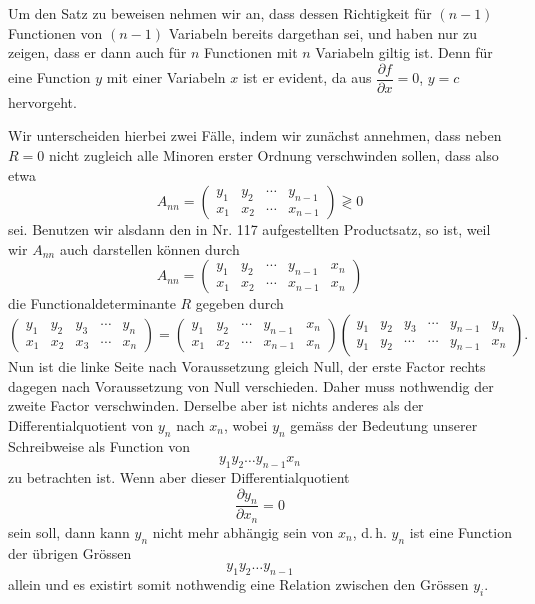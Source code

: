 \documentclass[11pt]{article}
\begin{document}
Um den Satz zu beweisen nehmen wir an, dass dessen Richtigkeit für $(n-1)$ Functionen von $(n-1)$ Variabeln bereits dargethan sei, und haben nur zu zeigen, dass er dann auch für $n$ Functionen mit $n$ Variabeln giltig ist. Denn für eine Function $y$ mit einer Variabeln $x$ ist er evident, da aus $\dfrac{\partial f}{\partial x} = 0$, $y = c$ hervorgeht.

Wir unterscheiden hierbei zwei Fälle, indem wir zunächst annehmen, dass neben $R = 0$ nicht zugleich alle Minoren erster Ordnung verschwinden sollen, dass also etwa
\[
A_{nn} = \begin{pmatrix} y_1 & y_2 & \cdots & y_{n-1} \\ x_1 & x_2 & \cdots & x_{n-1} \end{pmatrix} \gtrless 0
\]
sei. Benutzen wir alsdann den in Nr. 117 aufgestellten Productsatz, so ist, weil wir $A_{nn}$ auch darstellen können durch
\[
A_{nn} = \begin{pmatrix} y_1 & y_2 & \cdots & y_{n-1} & x_n \\ x_1 & x_2 & \cdots & x_{n-1} & x_n \end{pmatrix}
\]
die Functionaldeterminante $R$ gegeben durch
\[
\begin{pmatrix} y_1 & y_2 & y_3 & \cdots & y_n \\ x_1 & x_2 & x_3 & \cdots & x_n \end{pmatrix}
= \begin{pmatrix} y_1 & y_2 & \cdots & y_{n-1} & x_n \\ x_1 & x_2 & \cdots & x_{n-1} & x_n \end{pmatrix}
\begin{pmatrix} y_1 & y_2 & y_3 & \cdots & y_{n-1} & y_n \\ y_1 & y_2 & \cdots & \cdots & y_{n-1} & x_n \end{pmatrix}.
\]
Nun ist die linke Seite nach Voraussetzung gleich Null, der erste Factor rechts dagegen nach Voraussetzung von Null verschieden. Daher muss nothwendig der zweite Factor verschwinden. Derselbe aber ist nichts anderes als der Differentialquotient von $y_n$ nach $x_n$, wobei $y_n$ gemäss der Bedeutung unserer Schreibweise als Function von
\[
y_1 y_2 \ldots y_{n-1} x_n
\]
zu betrachten ist. Wenn aber dieser Differentialquotient
\[
\frac{\partial y_n}{\partial x_n} = 0
\]
sein soll, dann kann $y_n$ nicht mehr abhängig sein von $x_n$, d.\,h. $y_n$ ist eine Function der übrigen Grössen
\[
y_1 y_2 \ldots y_{n-1}
\]
allein und es existirt somit nothwendig eine Relation zwischen den Grössen $y_i$.
\end{document}

